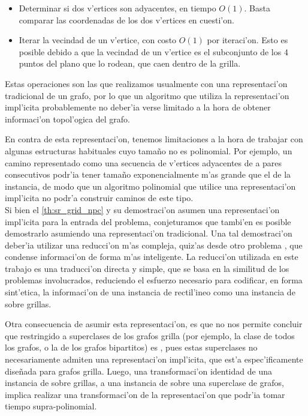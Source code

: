 \begin{itemize}
\item Determinar si dos v'ertices son adyacentes, en tiempo $O(1)$. Basta comparar las coordenadas de los dos v'ertices en cuesti'on.

\item Iterar la vecindad de un v'ertice, con costo $O(1)$ por iteraci'on. Esto es posible debido a que la vecindad de un v'ertice es el subconjunto de los 4 puntos del plano que lo rodean, que caen dentro de la grilla.
\end{itemize}

\noindent
Estas operaciones son las que realizamos usualmente con una representaci'on tradicional de un grafo, por lo que un algoritmo que utiliza la representaci'on impl'icita probablemente no deber'ia verse limitado a la hora de obtener informaci'on topol'ogica del grafo.

En contra de esta representaci'on, tenemos limitaciones a la hora de trabajar con algunas estructuras habituales cuyo tama\~no no es polinomial. Por ejemplo, un camino representado como una secuencia de v'ertices adyacentes de a pares consecutivos podr'ia tener tama\~no exponencialmente m'as grande que el de la instancia, de modo que un algoritmo polinomial que utilice una representaci'on impl'icita no podr'a construir caminos de este tipo.\\

Si bien el \autoref{th:sr_grid_npc} y su demostraci'on asumen una representaci'on impl'icita para la entrada del problema, conjeturamos que tambi'en es posible demostrarlo asumiendo una representaci'on tradicional. Una tal demostraci'on deber'ia utilizar una reducci'on m'as compleja, quiz'as desde otro problema , que condense informaci'on de forma m'as inteligente. La reducci'on utilizada en este trabajo es una traducci'on directa y simple, que se basa en la similitud de los problemas involucrados, reduciendo el esfuerzo necesario para codificar, en forma sint'etica, la informaci'on de una instancia de  rectil'ineo como una instancia de  sobre grillas.

Otra consecuencia de asumir esta representaci'on, es que no nos permite concluir que  restringido a superclases de los grafos grilla (por ejemplo, la clase de todos los grafos, o la de los grafos bipartitos) es , pues estas superclases no necesariamente admiten una representaci'on impl'icita, que est'a espec'ificamente dise\~nada para grafos grilla. Luego, una transformaci'on identidad de una instancia de  sobre grillas, a una instancia de  sobre una superclase de grafos, implica realizar una transformaci'on de la representaci'on que podr'ia tomar tiempo supra-polinomial.

